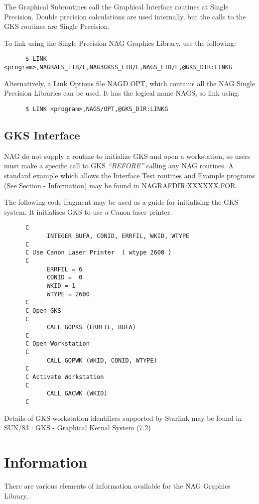 The Graphical Subroutines call the Graphical Interface routines at Single
Precision. Double precision calculations are used internally, but the calls to 
the GKS routines are Single Precision.   

To link using the Single Precision NAG Graphics Library, use the following:
\begin{verbatim}
      $ LINK <program>,NAGRAFS_LIB/L,NAG3GKSS_LIB/L,NAGS_LIB/L,@GKS_DIR:LINKG
\end{verbatim}
Alternatively, a Link Options file NAGD.OPT, which contains all the NAG Single
Precision Libraries can be used. It has the logical name NAGS, so link using:
\begin{verbatim}
      $ LINK <program>,NAGS/OPT,@GKS_DIR:LINKG
\end{verbatim}

\subsection{GKS Interface}

NAG do not supply a routine to initialize GKS and open a workstation, so users
must make a specific call to GKS {\em ``BEFORE''\/} calling any NAG routines.
A standard example which allows the Interface Test routines and Example
programs (See Section - Information) may be found in NAGRAFDIR:XXXXXX.FOR.

The following code fragment may be used as a guide for initialising the GKS
system. It initialises GKS to use a Canon laser printer.
\begin{verbatim}  
      C
            INTEGER BUFA, CONID, ERRFIL, WKID, WTYPE
      C
      C	Use Canon Laser Printer  ( wtype 2600 )
      C
            ERRFIL = 6
            CONID =  0
            WKID = 1
            WTYPE = 2600
      C
      C Open GKS
      C
            CALL GOPKS (ERRFIL, BUFA)
      C
      C Open Workstation
      C
            CALL GOPWK (WKID, CONID, WTYPE)
      C
      C Activate Workstation
      C
            CALL GACWK (WKID)
      C
\end{verbatim}

Details of GKS workstation identifiers supported by Starlink may be found in
SUN/83 : GKS - Graphical Kernal System (7.2)

\section{Information}

There are various elements of information available for the NAG Graphics
Library. 

